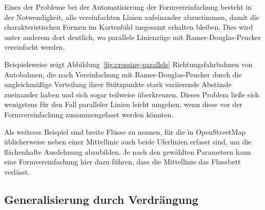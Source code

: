 \documentclass[../main/thesis.tex]{subfiles}
\begin{document}
Eines der Probleme bei der Automatisierung der Formvereinfachung besteht in der Notwendigkeit, alle vereinfachten Linien aufeinander abzustimmen, damit die charakteristischen Formen im Kartenbild insgesamt erhalten bleiben. 
Dies wird unter anderem dort deutlich, wo parallele Linienzüge mit Ramer-Douglas-Peucker vereinfacht werden.

Beispielsweise zeigt Abbildung~\ref{fig:crossing-parallels} Richtungsfahrbahnen von Autobahnen, die nach Vereinfachung mit Ramer-Douglas-Peucker durch die ungleichmäßige Verteilung ihrer Stützpunkte stark variierende Abstände zueinander haben und sich sogar teilweise überkreuzen.
Dieses Problem ließe sich wenigstens für den Fall paralleler Linien leicht umgehen, wenn diese vor der Formvereinfachung zusammengefasst werden könnten.

Als weiteres Beispiel sind breite Flüsse zu nennen, für die in OpenStreetMap üblicherweise neben einer Mittellinie auch beide Uferlinien erfasst sind, um die flächenhafte Ausdehnung abzubilden.
Je nach den gewählten Parametern kann eine Formvereinfachung hier dazu führen, dass die Mittellinie das Flussbett verlässt. 



\subsection{Generalisierung durch Verdrängung}
\end{document}
